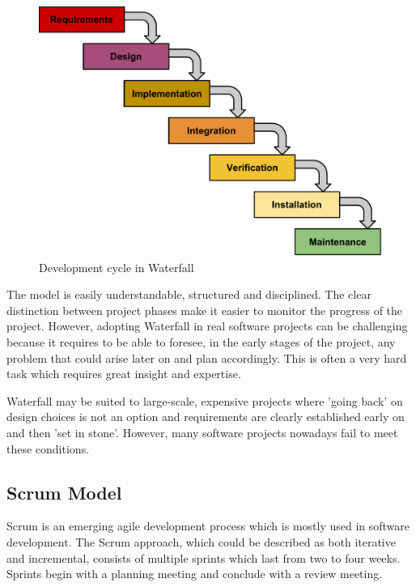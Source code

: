 \begin{figure}[h]
\begin{center}
\includegraphics[scale=0.6]{../Figures/Waterfall-model.pdf}
\end{center}
\caption{Development cycle in Waterfall}
\label{figure:waterfall-model}
\end{figure}

The model is easily understandable, structured and disciplined.
The clear distinction between project phases make it easier to monitor the progress of the project.
However, adopting Waterfall in real software projects can be challenging because it requires to be able to
foresee, in the early stages of the project, any problem that could arise later on and plan accordingly.
This is often a very hard task which requires great insight and expertise.

Waterfall may be suited to large-scale, expensive projects where 'going back' on design choices is not an
option and requirements are clearly established early on and then 'set in stone'.
However, many software projects nowadays fail to meet these conditions.

\subsection{Scrum Model}

Scrum is an emerging agile development process which is mostly used in software development.
The Scrum approach, which could be described as both iterative and incremental, consists of multiple
sprints which last from two to four weeks. Sprints begin with a planning meeting and conclude with a review meeting.


